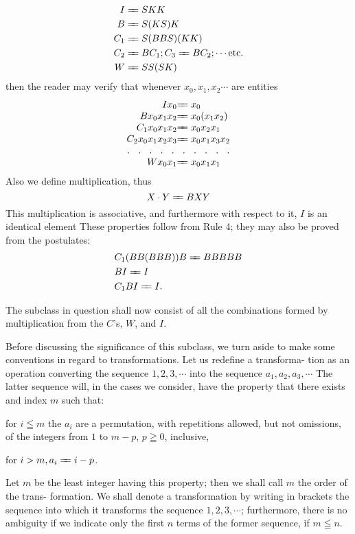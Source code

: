 \documentclass[10pt, twoside]{extarticle}
\def\varequals#1{\mathrel{\leaders\hbox to3pt{$=$\hss}\hskip#1=}}
\newcommand\longeq{\varequals{0.4em}}
\theoremstyle{breaktheorem}
\theoremstyle{mylemma}
\theoremstyle{mydefinition}
\theoremstyle{mycorollary}
\begin{document}
\begin{align*}
  I &\longeq SKK \\
  B &\longeq S(KS)K \\
  C_1 &\longeq S(BBS)(KK) \\
  C_2 &\longeq BC_1; C_3 \longeq BC_2; \cdots \text{etc.} \\
  W &\longeq SS(SK)
\end{align*}
then the reader may verify that whenever \(x_0, x_1, x_2 \cdots\) are entities
\begin{equation*}
  \renewcommand{\arraycolsep}{0pt}%
  \begin{array}{rl}
  Ix_0 &\longeq x_0 \\
  Bx_0x_1x_2 &\longeq x_0(x_1x_2) \\
  C_1x_0x_1x_2 &\longeq x_0x_2x_1 \\
  C_2x_0x_1x_2x_3 &\longeq x_0x_1x_3x_2 \\
  \hdotsfor[5]{2} \\
  Wx_0x_1 &\longeq x_0x_1x_1
  \end{array}
\end{equation*}
Also we define multiplication, thus
\[X\cdot Y \longeq BXY\]
This multiplication is associative, and furthermore with respect to it, \(I\) is an
identical element These properties follow from Rule 4; they may also be
proved from the postulates:
\begin{align*}
  &C_1(BB(BBB))B \longeq BBBBB \\
  &BI \longeq I \\
  &C_1BI \longeq I. \\
\end{align*}

The subclass in question shall now consist of all the combinations formed by multiplication from the \(C\)'s, \(W\), and \(I\).

\sloppy Before discussing the significance of this subclass, we turn aside to make
some conventions in regard to transformations. Let us redefine a transforma-
tion as an operation converting the sequence \(1, 2, 3, \cdots\) into the sequence
\(a_1, a_2, a_3, \cdots\) The latter sequence will, in the cases we consider, have the
property that there exists and index \(m\) such that:
\begin{enumerate*}[label=\arabic*)]
\item for \(i \leqq m\) the \(a_i\) are a
  permutation, with repetitions allowed, but not omissions, of the integers from
  \(1\) to \(m - p\), \(p \geqq 0\), inclusive, \item for \(i > m, a_i \longeq i - p\). \end{enumerate*} Let \(m\) be the least
integer having this property; then we shall call \(m\) the order of the trans-
formation. We shall denote a transformation by writing in brackets the
sequence into which it transforms the sequence \(1, 2, 3, \cdots\); furthermore,
there is no ambiguity if we indicate only the first \(n\) terms of the former
sequence, if \(m \leqq n\).
\end{document}
